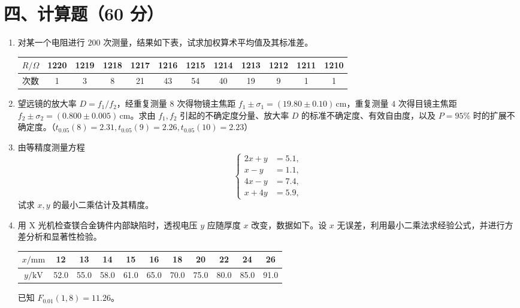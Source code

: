 \documentclass[UTF8,12pt,a4paper]{ctexart}
\begin{document}
\section*{四、计算题（60 分）}
\begin{enumerate}[label=\arabic*、]
\item 对某一个电阻进行 $200$ 次测量，结果如下表，试求加权算术平均值及其标准差。
\begin{center}
\begin{tabular}{c|ccccccccccc}
\toprule
$R/\Omega$&1220&1219&1218&1217&1216&1215&1214&1213&1212&1211&1210\\
\midrule
次数&1&3&8&21&43&54&40&19&9&1&1\\
\bottomrule
\end{tabular}
\end{center}
\item 望远镜的放大率 $D=f_1/f_2$，经重复测量 $8$ 次得物镜主焦距 $f_1\pm\sigma_1=(19.80\pm0.10)\,\mathrm{cm}$，重复测量 $4$ 次得目镜主焦距 $f_2\pm\sigma_2=(0.800\pm0.005)\,\mathrm{cm}$。求由 $f_1,f_2$ 引起的不确定度分量、放大率 $D$ 的标准不确定度、有效自由度，以及 $P=95\%$ 时的扩展不确定度。（$t_{0.05}(8)=2.31,t_{0.05}(9)=2.26,t_{0.05}(10)=2.23$）
\item 由等精度测量方程
\begin{equation*}
\left\{
\begin{aligned}
2x+y&=5.1,\\
x-y&=1.1,\\
4x-y&=7.4,\\
x+4y&=5.9,
\end{aligned}
\right.
\end{equation*}
试求 $x,y$ 的最小二乘估计及其精度。
\item 用 X 光机检查镁合金铸件内部缺陷时，透视电压 $y$ 应随厚度 $x$ 改变，数据如下。设 $x$ 无误差，利用最小二乘法求经验公式，并进行方差分析和显著性检验。
\begin{center}
\begin{tabular}{c|cccccccccc}
\toprule
$x/\mathrm{mm}$&12&13&14&15&16&18&20&22&24&26\\
\midrule
$y/\mathrm{kV}$&52.0&55.0&58.0&61.0&65.0&70.0&75.0&80.0&85.0&91.0\\
\bottomrule
\end{tabular}
\end{center}
已知 $F_{0.01}(1,8)=11.26$。
\end{enumerate}
\end{document}
